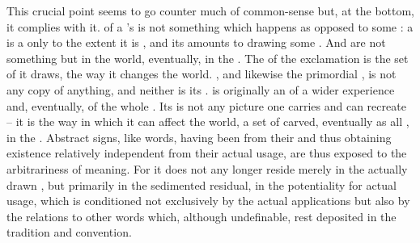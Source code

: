 This crucial point seems to go counter much of common-sense but, at the bottom,
it complies with it.  of a 's  is not
something which happens  as opposed to some : a  is a  only to the extent it is ,
and its  amounts to drawing some . And
 are not something  but in the world,
eventually, in the . The  of the exclamation
 is the set of  it
draws, the way it changes the world.
%
, and likewise the primordial , is not any copy of
anything, and neither is its .  is originally an  of a wider experience and, eventually, of the whole .
Its  is not any picture one carries and can recreate  -- it is the way in which it can affect the world, a set of
 carved, eventually as all , in the
.  Abstract signs, like words, having been  from
their  and thus obtaining existence relatively independent from
their actual usage, are thus exposed to the arbitrariness of meaning. For it
does not any longer reside merely in the actually drawn , but
primarily in the sedimented residual, in the  potentiality for actual
usage, which is conditioned not exclusively by the actual applications but also
by the relations to other words which, although undefinable, rest deposited in
the tradition and convention.


